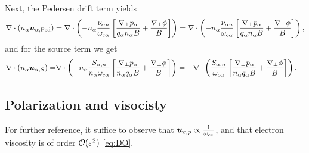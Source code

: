 Next, the Pedersen drift term yields
%
\begin{align*}
    \nabla\cdot\left(n_\alpha \boldsymbol{u}_{\alpha,\text{Ped}}\right)
    =
    \nabla\cdot\left(
    - n_\alpha \frac{\nu_{\alpha n} }{\omega_{c\alpha}}
    \left[\frac{\nabla_\perp p_\alpha}{q_\alpha n_\alpha B}
    + \frac{\nabla_\perp \phi}{B} \right]
    \right)
    =
    \nabla\cdot\left(
    - n_\alpha \frac{\nu_{\alpha n} }{\omega_{c\alpha}}
    \left[\frac{\nabla_\perp p_\alpha}{q_\alpha n_\alpha B}
    + \frac{\nabla_\perp \phi}{B} \right]
    \right)
    ,
\end{align*}
%
and for the source term we get
%
\begin{align*}
    \nabla\cdot\left(n_\alpha \boldsymbol{u}_{\alpha,S}\right)
    =&
    \nabla\cdot\left(
    - n_\alpha
  \frac{ S_{\alpha,n}}{n_\alpha \omega_{c\alpha}}
  \left[
  \frac{\nabla_\perp p_\alpha}{n_\alpha  q_\alpha B}
  + \frac{\nabla_\perp \phi}{B}
  \right]    \right)
  =
  -
  \nabla\cdot\left(
  \frac{ S_{\alpha,n}}{\omega_{c\alpha}}
  \left[
  \frac{\nabla_\perp p_\alpha}{n_\alpha  q_\alpha B}
  + \frac{\nabla_\perp \phi}{B}
  \right]    \right).
\end{align*}
%

\subsection{Polarization and visocisty}
\label{sec:gyrovisc}
%
For further reference, it suffice to observe that $\boldsymbol{u}_{e,p}\propto\frac{1}{\omega_{ce}}$, and that electron viscosity is of order $\mathcal{O}(\varepsilon^2)$ \cref{eq:DO}.

